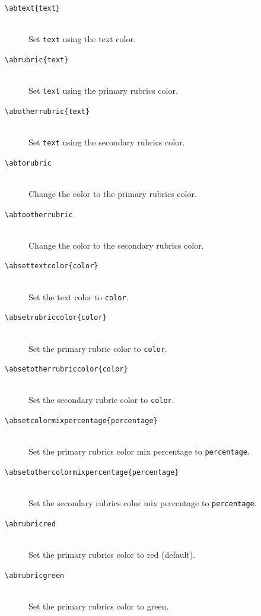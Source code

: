 \documentclass[a4paper]{article}
\newcommand{\package}[1]{\texttt{#1}}
\newcommand{\ltxncmd}[1]{\texttt{\textbackslash{}#1}}
\newcommand{\ltxcmd}[2]{\texttt{\textbackslash{}#1\{#2\}}}
\begin{document}
\begin{description}

\item [\ltxcmd{abtext}{text}] \mbox{} \\
  Set \package{text} using the text color. 

\item[\ltxcmd{abrubric}{text}] \mbox{} \\
  Set \package{text} using the primary rubrics color. 
  

\item [\ltxcmd{abotherrubric}{text}] \mbox{} \\
  Set \package{text} using the secondary rubrics color. 
  
\item[\ltxncmd{abtorubric}] \mbox{} \\
  Change the color to the primary rubrics color. 

\item[\ltxncmd{abtootherrubric}] \mbox{} \\
  Change the color to the secondary rubrics color. 
  
\item [\ltxcmd{absettextcolor}{color}] \mbox{} \\
  Set the text color to \package{color}.
    
\item[\ltxcmd{absetrubriccolor}{color}] \mbox{} \\
  Set the primary rubric color to \package{color}.
  
\item[\ltxcmd{absetotherrubriccolor}{color}] \mbox{} \\
  Set the secondary rubric color to \package{color}. 
  
\item [\ltxcmd{absetcolormixpercentage}{percentage}] \mbox{} \\
  Set the primary rubrics color mix percentage to
  \package{percentage}.
  
\item [\ltxcmd{absetothercolormixpercentage}{percentage}]\mbox{} \\
  Set the secondary rubrics color mix percentage to
  \package{percentage}.

\item [\ltxncmd{abrubricred}]\mbox{}  \\
  Set the primary rubrics color to red (default). 

\item [\ltxncmd{abrubricgreen}]\mbox{}  \\
  Set the primary rubrics color to green. 



\end{description}
\end{document}
